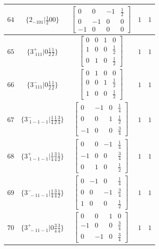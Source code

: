 \documentclass[fleqn,8pt]{jsarticle}
\begin{document}
\begin{longtable}{ccccc}
$ 64 $ & $ \{2{}_{-101}|\frac{1}{2} 0 0\} $ & $ \begin{bmatrix} 0 & 0 & -1 & \frac{1}{2} \\ 0 & -1 & 0 & 0 \\ -1 & 0 & 0 & 0 \end{bmatrix} $ & $ 1 $ & $ 1 $ \\ \hline
$ 65 $ & $ \{3^{+}_{\,\,111}|0 \frac{1}{2} \frac{1}{2}\} $ & $ \begin{bmatrix} 0 & 0 & 1 & 0 \\ 1 & 0 & 0 & \frac{1}{2} \\ 0 & 1 & 0 & \frac{1}{2} \end{bmatrix} $ & $ 1 $ & $ 1 $ \\ \hline
$ 66 $ & $ \{3^{-}_{\,\,111}|0 \frac{1}{2} \frac{1}{2}\} $ & $ \begin{bmatrix} 0 & 1 & 0 & 0 \\ 0 & 0 & 1 & \frac{1}{2} \\ 1 & 0 & 0 & \frac{1}{2} \end{bmatrix} $ & $ 1 $ & $ 1 $ \\ \hline
$ 67 $ & $ \{3^{-}_{\,\,1-1-1}|\frac{1}{4} \frac{1}{2} \frac{3}{4}\} $ & $ \begin{bmatrix} 0 & -1 & 0 & \frac{1}{4} \\ 0 & 0 & 1 & \frac{1}{2} \\ -1 & 0 & 0 & \frac{3}{4} \end{bmatrix} $ & $ 1 $ & $ 1 $ \\ \hline
$ 68 $ & $ \{3^{+}_{\,\,1-1-1}|\frac{1}{4} \frac{3}{4} \frac{1}{2}\} $ & $ \begin{bmatrix} 0 & 0 & -1 & \frac{1}{4} \\ -1 & 0 & 0 & \frac{3}{4} \\ 0 & 1 & 0 & \frac{1}{2} \end{bmatrix} $ & $ 1 $ & $ 1 $ \\ \hline
$ 69 $ & $ \{3^{-}_{\,\,-11-1}|\frac{1}{4} \frac{3}{4} \frac{1}{2}\} $ & $ \begin{bmatrix} 0 & -1 & 0 & \frac{1}{4} \\ 0 & 0 & -1 & \frac{3}{4} \\ 1 & 0 & 0 & \frac{1}{2} \end{bmatrix} $ & $ 1 $ & $ 1 $ \\ \hline
$ 70 $ & $ \{3^{+}_{\,\,-11-1}|0 \frac{3}{4} \frac{3}{4}\} $ & $ \begin{bmatrix} 0 & 0 & 1 & 0 \\ -1 & 0 & 0 & \frac{3}{4} \\ 0 & -1 & 0 & \frac{3}{4} \end{bmatrix} $ & $ 1 $ & $ 1 $ \\ \hline

\end{longtable}
\end{document}
